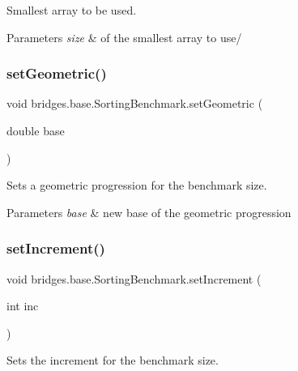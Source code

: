 Smallest array to be used. 


\begin{DoxyParams}{Parameters}
{\em size} & of the smallest array to use/ \\
\hline
\end{DoxyParams}
\mbox{\label{classbridges_1_1base_1_1_sorting_benchmark_ac85461710590f4baeea7d7b72da3d66f}} 
\subsubsection{\texorpdfstring{setGeometric()}{setGeometric()}}
{\footnotesize\ttfamily void bridges.\+base.\+Sorting\+Benchmark.\+set\+Geometric (\begin{DoxyParamCaption}\item[{double}]{base }\end{DoxyParamCaption})}



Sets a geometric progression for the benchmark size. 


\begin{DoxyParams}{Parameters}
{\em base} & new base of the geometric progression \\
\hline
\end{DoxyParams}
\mbox{\label{classbridges_1_1base_1_1_sorting_benchmark_aed0a9db639ec08c6ae1b5b70a1662809}} 
\subsubsection{\texorpdfstring{setIncrement()}{setIncrement()}}
{\footnotesize\ttfamily void bridges.\+base.\+Sorting\+Benchmark.\+set\+Increment (\begin{DoxyParamCaption}\item[{int}]{inc }\end{DoxyParamCaption})}



Sets the increment for the benchmark size. 



